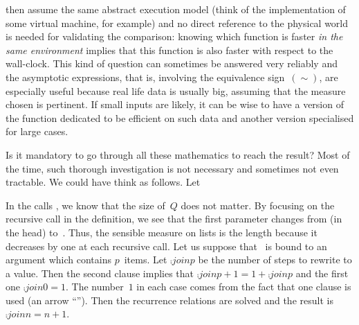 then assume the same abstract execution model (think of the
implementation of some virtual machine, for example) and no direct
reference to the physical world is needed for validating the
comparison: knowing which function is faster \emph{in the same
  environment} implies that this function is also faster with respect
to the wall\hyp{}clock. This kind of question can sometimes be
answered very reliably and the asymptotic expressions, that is,
involving the equivalence sign~\((\sim)\), are especially useful
because real life data is usually big, assuming that the measure
chosen is pertinent. If small inputs are likely, it can be wise to
have a version of the function dedicated to be efficient on such data
and another version specialised for large cases.

Is it mandatory to go through all these mathematics to reach the
result? Most of the time, such thorough investigation is not necessary
and sometimes not even tractable. We could have think as follows. Let



\noindent In the calls , we know that the
size of~\(Q\) does not matter. By focusing on the recursive call in
the definition, we see that the first parameter changes from
\erlcode{[I|P]} (in the head) to~. Thus, the sensible
measure on lists is the length because it decreases by one at each
recursive call. Let us suppose that ~is bound to an
argument which contains \(p\)~items. Let \(\comp{join}{p}\) be the
number of steps to rewrite  to a
value. Then the second clause implies that \(\comp{join}{p+1} = 1 +
\comp{join}{p}\) and the first one \(\comp{join}{0} = 1\). The
number~\(1\) in each case comes from the fact that one clause is used
(an arrow ``\erlcode{->}''). Then the recurrence relations are solved
and the result is \(\comp{join}{n} = n + 1\).

